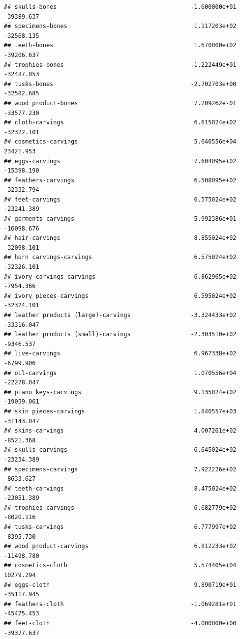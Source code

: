 \documentclass[
  12pt,
]{article}
\begin{document}
\begin{verbatim}
## skulls-bones                                      -1.600000e+01  -39389.637
## specimens-bones                                    1.117203e+02  -32568.135
## teeth-bones                                        1.670000e+02  -39206.637
## trophies-bones                                    -1.222449e+01  -32487.053
## tusks-bones                                       -2.702703e+00  -32582.685
## wood product-bones                                 7.209262e-01  -33577.230
## cloth-carvings                                     6.615024e+02  -32322.101
## cosmetics-carvings                                 5.640556e+04   23421.953
## eggs-carvings                                      7.604095e+02  -15398.190
## feathers-carvings                                  6.508095e+02  -32332.794
## feet-carvings                                      6.575024e+02  -23241.389
## garments-carvings                                  5.992386e+01  -16098.676
## hair-carvings                                      8.855024e+02  -32098.101
## horn carvings-carvings                             6.575024e+02  -32326.101
## ivory carvings-carvings                            6.862965e+02   -7954.366
## ivory pieces-carvings                              6.595024e+02  -32324.101
## leather products (large)-carvings                 -3.324433e+02  -33316.047
## leather products (small)-carvings                 -2.303510e+02   -9346.537
## live-carvings                                      6.967338e+02   -6799.906
## oil-carvings                                       1.070556e+04  -22278.047
## piano keys-carvings                                9.135024e+02  -19059.061
## skin pieces-carvings                               1.840557e+03  -31143.047
## skins-carvings                                     4.007261e+02   -8521.368
## skulls-carvings                                    6.645024e+02  -23234.389
## specimens-carvings                                 7.922226e+02   -8633.627
## teeth-carvings                                     8.475024e+02  -23051.389
## trophies-carvings                                  6.682779e+02   -8020.116
## tusks-carvings                                     6.777997e+02   -8395.730
## wood product-carvings                              6.812233e+02  -11498.780
## cosmetics-cloth                                    5.574405e+04   10279.294
## eggs-cloth                                         9.890719e+01  -35117.945
## feathers-cloth                                    -1.069281e+01  -45475.453
## feet-cloth                                        -4.000000e+00  -39377.637

\end{verbatim}
\end{document}
